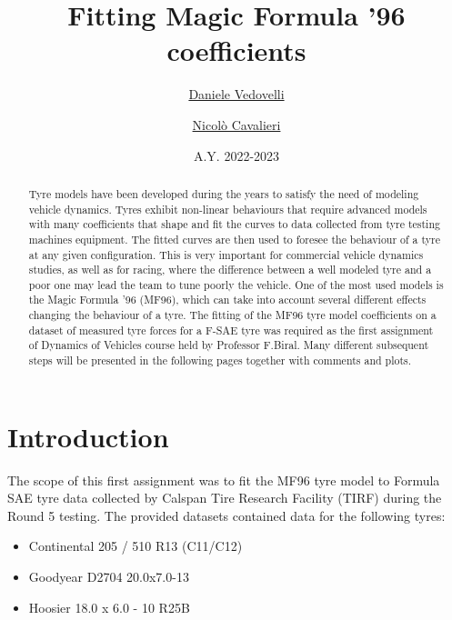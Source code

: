 \documentclass{IEEEtran}
\title{\textbf{Fitting Magic Formula '96 coefficients\\}}
\begin{document}
    \author{\underline{Daniele Vedovelli}}
    \author{\underline{Nicolò Cavalieri}}
   
    \date{A.Y. 2022-2023}
    
    \maketitle
    
    \tableofcontents

    
    \bigskip
    \bigskip

    \begin{abstract}
    Tyre models have been developed during the years to satisfy the need of modeling vehicle dynamics. Tyres exhibit non-linear behaviours that require advanced models with many coefficients that shape and fit the curves to data collected from tyre testing machines equipment. The fitted curves are then used to foresee the behaviour of a tyre at any given configuration. This is very important for commercial vehicle dynamics studies, as well as for racing, where the difference between a well modeled tyre and a poor one may lead the team to tune poorly the vehicle. One of the most used models is the Magic Formula '96 (MF96), which can take into account several different effects changing the behaviour of a tyre. The fitting of the MF96 tyre model coefficients on a dataset of measured tyre forces for a  F-SAE tyre was required as the first assignment of Dynamics of Vehicles course held by Professor F.Biral. Many different subsequent steps will be presented in the following pages together with comments and plots.
    \end{abstract}
    
    \section{\textbf{Introduction}}
     The scope of this first assignment was to fit the MF96 tyre model to Formula SAE tyre data collected by Calspan Tire Research Facility (TIRF) during the Round 5 testing. The provided datasets contained data for the following tyres:
        \begin{itemize}
                \item Continental 205 / 510 R13 (C11/C12)
                \item Goodyear D2704 20.0x7.0-13
                \item Hoosier 18.0 x 6.0 - 10 R25B
        \end{itemize}
\end{document}
